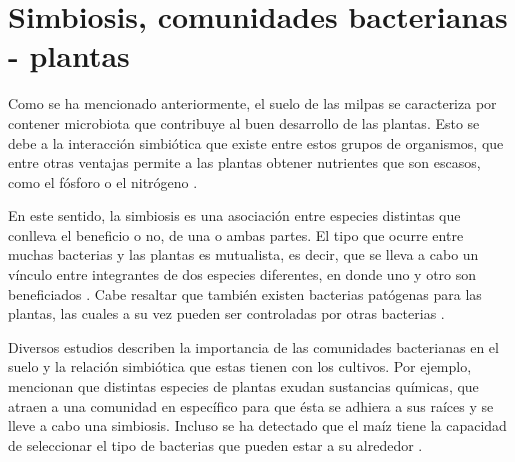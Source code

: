 \documentclass[12pt,letterpaper,oneside]{report}
\begin{document}
\section{Simbiosis, comunidades bacterianas - plantas}
Como se ha mencionado anteriormente, el suelo de las milpas se caracteriza por contener microbiota que contribuye al buen desarrollo de las plantas. Esto se debe a la interacción simbiótica que existe entre estos grupos de organismos, que entre otras ventajas permite a las plantas obtener nutrientes que son escasos, como el fósforo o el nitrógeno \autocite{Martin2017}.
\par
En este sentido, la simbiosis es una asociación entre especies distintas que conlleva el beneficio o no, de una o ambas partes. El tipo que ocurre entre muchas bacterias y las plantas es mutualista, es decir, que se lleva a cabo un vínculo entre integrantes de dos especies diferentes, en donde uno y otro son beneficiados \autocite{Smith2007}. Cabe resaltar que también existen bacterias patógenas para las plantas, las cuales a su vez pueden ser controladas por otras bacterias \autocite{Barka2015,Vejan2016}.
\par
Diversos estudios describen la importancia de las comunidades bacterianas en el suelo y la relación simbiótica que estas tienen con los cultivos. Por ejemplo, \textcite{Garbeva2007} mencionan que distintas especies de plantas exudan sustancias químicas, que atraen a una comunidad en específico para que ésta se adhiera a sus raíces y se lleve a cabo una simbiosis. Incluso se ha detectado que el maíz tiene la capacidad de seleccionar el tipo de bacterias que pueden estar a su alrededor \autocite{Aguirre-von-Wobeser2018,Niu2017}.
\newpage
\end{document}
